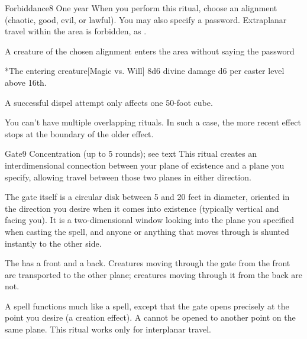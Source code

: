 \begin{spellsection}{Forbiddance}{8}
\spelldur One year
\spellspecial When you perform this ritual, choose an alignment (chaotic, good, evil, or lawful). You may also specify a password.
\spellline
\spelleffect Extraplanar travel within the area is forbidden, as .
\begin{spelltrigger}{A creature of the chosen alignment enters the area without saying the password}
    \begin{spelltarget}*{The entering creature}[Magic vs. Will]
        \spellsuccess 8d6 divine damage \add d6 per caster level above 16th.
    \end{spelltarget}
\end{spelltrigger}
\spellnotes A successful dispel attempt only affects one 50-foot cube.
\par You can't have multiple overlapping  rituals. In such a case, the more recent effect stops at the boundary of the older effect.
\end{spellsection}

\begin{spellsection}{Gate}{9}
\spellrng{\rngmed}
\spelldur Concentration (up to 5 rounds); see text
\spellline
\spelleffect This ritual creates an interdimensional connection between your plane of existence and a plane you specify, allowing travel between those two planes in either direction.
\par The gate itself is a circular disk between 5 and 20 feet in diameter, oriented in the direction you desire when it comes into existence (typically vertical and facing you). It is a two-dimensional window looking into the plane you specified when casting the spell, and anyone or anything that moves through is shunted instantly to the other side.
\par The  has a front and a back. Creatures moving through the gate from the front are transported to the other plane; creatures moving through it from the back are not.
\par A  spell functions much like a  spell, except that the gate opens precisely at the point you desire (a creation effect). 
\spellnotes A  cannot be opened to another point on the same plane. This ritual works only for interplanar travel.
\end{spellsection}

